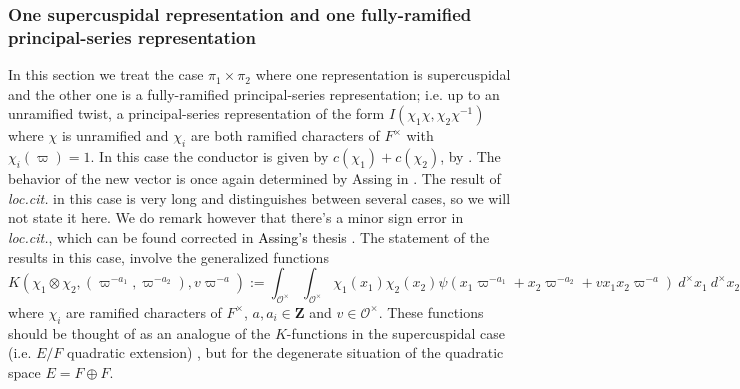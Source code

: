 \documentclass{amsart}
\theoremstyle{plain}
\theoremstyle{plain}
\theoremstyle{remark}
\begin{document}
\subsubsection{One supercuspidal representation and one fully-ramified principal-series representation}
In this section we treat the case $\pi_1\times \pi_2$ where one representation is supercuspidal and the other one is a fully-ramified principal-series representation; i.e. up to an unramified twist, a principal-series representation of the form $I(\chi_1\chi,\chi_2\chi^{-1})$ where $\chi$ is unramified and $\chi_i$ are both ramified characters of $F^\times$ with $\chi_i(\varpi)=1$. In this case the conductor is given by $c(\chi_1)+c(\chi_2)$, by \cite{schmidt2002some}. The behavior of the new vector is once again determined by Assing in \cite[Lemma $3.6$]{Assing_2018}. The result of \textit{loc.cit.} in this case is very long and distinguishes between several cases, so we will not state it here. We do remark however that there's a minor sign error in \textit{loc.cit.}, which can be found corrected in \textcolor{black}{Assing's} thesis \cite[Lemma $3.3.9$]{Assing_2019}. The statement of the results in this case, involve  the generalized functions $${K\left(\chi_1\otimes\chi_2,(\varpi^{-a_1},\varpi^{-a_2}),v\varpi^{-a}\right):=\int_{\mathcal{O}^\times}\int_{\mathcal{O}^\times}}\chi_1(x_1)\chi_2(x_2)\psi(x_1\varpi^{-a_1}+x_2\varpi^{-a_2}+vx_1x_2\varpi^{-a})\ d^\times x_1\ d^\times x_2$$
where $\chi_i$ are ramified characters of $F^\times$, $a,a_i\in\mathbf{Z}$ and $v\in \mathcal{O}^\times$. These functions should be thought of as an analogue of the $K$-functions in the supercuspidal case (i.e. $E/F$ quadratic extension) , but for the degenerate situation of the quadratic space $E=F\oplus F$.
\end{document}
